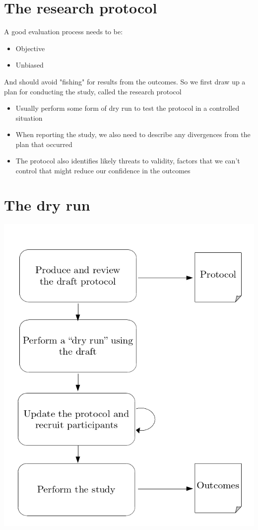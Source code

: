\documentclass{article}[18pt]
\begin{document}
\section{The research protocol}
A good evaluation process needs to be:
\begin{itemize}
	\item Objective
	\item Unbiased
\end{itemize}
And should avoid "fishing" for results from the outcomes. So we first draw up a plan for conducting the study, called the research protocol
\begin{itemize}
	\item Usually perform some form of dry run to test the protocol in a controlled situation
	\item When reporting the study, we also need to describe any divergences from the plan that occurred
	\item The protocol also identifies likely threats to validity, factors that we can't control that might reduce our confidence in the outcomes
\end{itemize}
\section{The dry run}
\includegraphics[scale=0.5]{dryrun}
\end{document}
